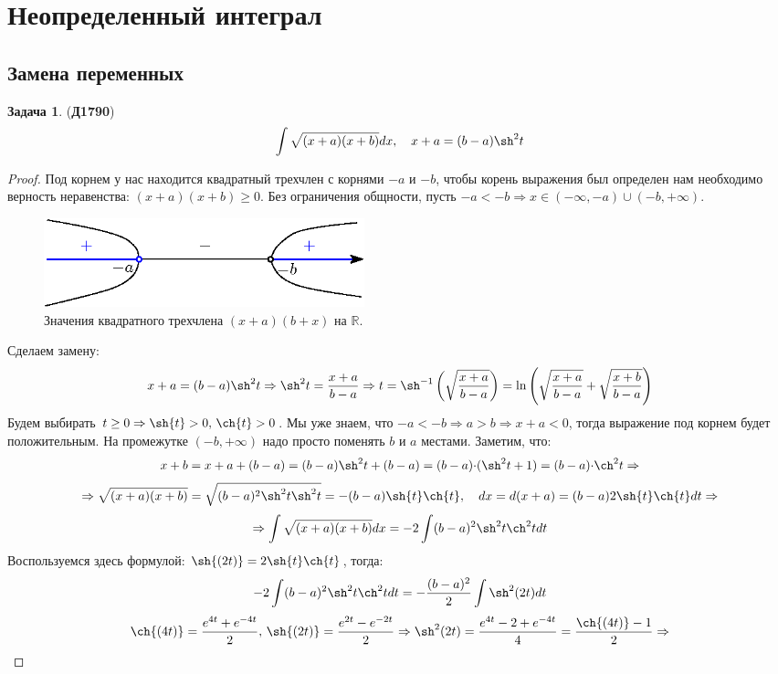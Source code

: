 \documentclass[12pt]{article}
\newcommand{\RN}[1]{%
	\textup{\uppercase\expandafter{\romannumeral#1}}%
}
\newcommand{\MR}{\mathbb{R}}
\theoremstyle{definition}
\newtheorem{problem}{Задача}
\DeclareMathOperator{\dint}{\displaystyle\int}
\begin{document}
\lhead{Математический анализ - \RN{2}}
\section*{Неопределенный интеграл}
\subsection*{Замена переменных}
\begin{problem}(\textbf{Д1790})
	$$
		\dint \sqrt{(x+a)(x+b)}dx,\quad x + a = (b-a)\sh^2{t}
	$$
\end{problem}
\begin{proof}
	Под корнем у нас находится квадратный трехчлен с корнями $-a$ и $-b$, чтобы корень выражения был определен нам необходимо верность неравенства: $(x+a)(x+b) \geq  0$. Без ограничения общности, пусть $-a < -b \Rightarrow x \in (-\infty,-a)\cup (-b, + \infty)$. 	
	\begin{figure}[H]
		\centering
		\includegraphics[width=0.45\textwidth]{MA2S3_1.eps}
		\caption{Значения квадратного трехчлена $(x+a)(b+x)$ на $\MR$.}
		\label{3_1}
	\end{figure}
	Сделаем замену: 
	$$
		x+ a = (b-a)\sh^2{t} \Rightarrow \sh^2{t} = \dfrac{x + a}{b-a} \Rightarrow t =\sh^{-1}\left(\sqrt{\dfrac{x+a}{b-a}}\right) = \ln{\left(\sqrt{\dfrac{x+a}{b-a}} + \sqrt{\dfrac{x+b}{b-a}}\right)}
	$$ 
	Будем выбирать $t \geq 0 \Rightarrow \sh{t} > 0, \, \ch{t} > 0$. Мы уже знаем, что $-a < -b \Rightarrow a >  b \Rightarrow x + a < 0$, тогда выражение под корнем будет положительным. На промежутке $(-b,+\infty)$ надо просто поменять $b$ и $a$ местами. Заметим, что:
	$$
		x + b = x + a + (b - a) = (b-a)\sh^2{t} + (b-a) = (b-a){\cdot}(\sh^2{t} + 1) = (b-a){\cdot}\ch^2{t} \Rightarrow
	$$
	$$
		\Rightarrow \sqrt{(x+a)(x+b)} = \sqrt{(b-a)^2\sh^2{t}\sh^2{t}} = -(b-a)\sh{t}\ch{t}, \quad dx = d(x + a) = (b-a)2\sh{t}\ch{t}dt \Rightarrow
	$$
	$$
		\Rightarrow  \dint \sqrt{(x+a)(x+b)}dx = -2\dint (b-a)^2 \sh^2{t}\ch^2{t}dt
	$$
	Воспользуемся здесь формулой: $\sh{(2t)} = 2\sh{t}\ch{t}$, тогда:
	$$
		-2\dint (b-a)^2 \sh^2{t}\ch^2{t}dt = -\dfrac{(b-a)^2}{2}\dint \sh^2{(2t)}dt 
	$$
	$$
		\ch{(4t)} = \dfrac{e^{4t} + e^{-4t}}{2}, \, \sh{(2t)} = \dfrac{e^{2t} - e^{-2t}}{2} \Rightarrow \sh^2{(2t)} = \dfrac{e^{4t} -2 + e^{-4t}}{4} = \dfrac{\ch{(4t)} - 1}{2} \Rightarrow
$$
\end{proof}
\end{document}
